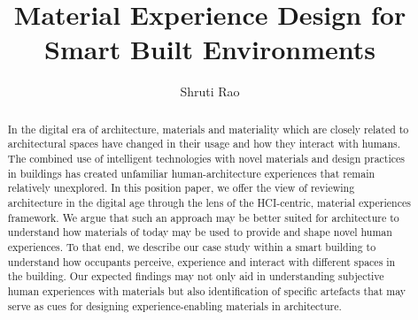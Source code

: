\documentclass[manuscript, anonymous, review]{acmart}
\begin{document}
\title{Material Experience Design for Smart Built Environments}

\author{Shruti Rao}


\renewcommand{\shortauthors}{Rao et al.}

\begin{abstract}


In the digital era of architecture, materials and materiality which are closely related to architectural spaces have changed in their usage and how they interact with humans. The combined use of intelligent technologies with novel materials and design practices in buildings has created unfamiliar human-architecture experiences that remain relatively unexplored. In this position paper, we offer the view of reviewing architecture in the digital age through the lens of the HCI-centric, material experiences framework. We argue that such an approach may be better suited for architecture to understand how materials of today may be used to provide and shape novel human experiences. To that end, we describe our case study within a smart building to understand how occupants perceive, experience and interact with different spaces in the building. Our expected findings may not only aid in understanding subjective human experiences with materials but also identification of specific artefacts that may serve as cues for designing experience-enabling materials in architecture.
\end{abstract}
\end{document}
